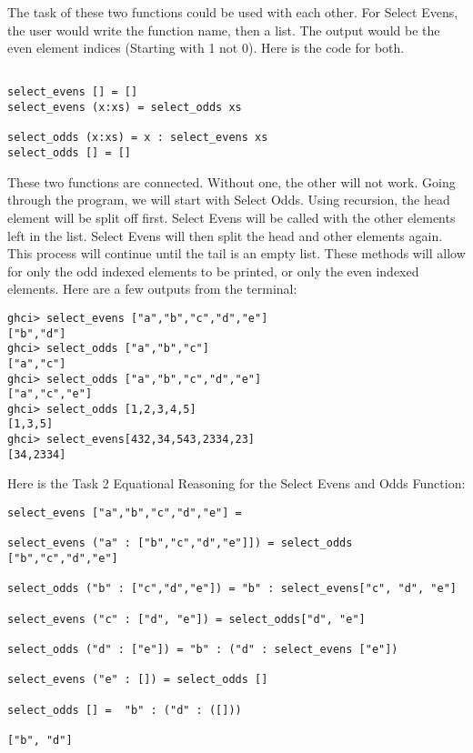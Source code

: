 \documentclass{article}
\theoremstyle{theorem}
\theoremstyle{definition}
\theoremstyle{remark}
\begin{document}
The task of these two functions could be used with each other. For Select Evens, the user would write the function name, then a list. The output would be the even element indices (Starting with 1 not 0). Here is the code for both.

\begin{verbatim}

select_evens [] = []
select_evens (x:xs) = select_odds xs

select_odds (x:xs) = x : select_evens xs
select_odds [] = []
\end{verbatim}

\noindent These two functions are connected. Without one, the other will not work.
\newline
\newline Going through the program, we will start with Select Odds. Using recursion, the head element will be split off first. Select Evens will be called with the other elements left in the list. Select Evens will then split the head and other elements again. This process will continue until the tail is an empty list. These methods will allow for only the odd indexed elements to be printed, or only the even indexed elements. 
\newline
\newline Here are a few outputs from the terminal:
\begin{verbatim}
ghci> select_evens ["a","b","c","d","e"]
["b","d"]
ghci> select_odds ["a","b","c"]
["a","c"]
ghci> select_odds ["a","b","c","d","e"]
["a","c","e"]
ghci> select_odds [1,2,3,4,5]
[1,3,5]
ghci> select_evens[432,34,543,2334,23]
[34,2334]
\end{verbatim}
\noindent\newline\newline Here is the Task 2 Equational Reasoning for the Select Evens and Odds Function:

\begin{verbatim}
select_evens ["a","b","c","d","e"] = 

select_evens ("a" : ["b","c","d","e"]]) = select_odds ["b","c","d","e"]

select_odds ("b" : ["c","d","e"]) = "b" : select_evens["c", "d", "e"]

select_evens ("c" : ["d", "e"]) = select_odds["d", "e"]

select_odds ("d" : ["e"]) = "b" : ("d" : select_evens ["e"])

select_evens ("e" : []) = select_odds []

select_odds [] =  "b" : ("d" : ([]))

["b", "d"]
\end{verbatim}
\end{document}
